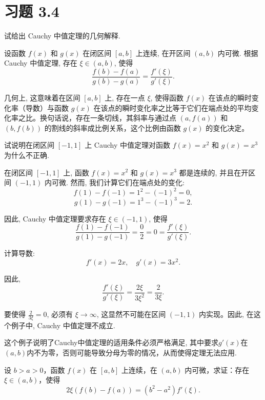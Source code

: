 \section{习题 3.4}

\begin{exercise}[3.4.1]
    试给出 Cauchy 中值定理的几何解释.
\end{exercise}

\begin{solution}
    设函数 $f(x)$ 和 $g(x)$ 在闭区间 $[a, b]$ 上连续, 在开区间 $(a, b)$ 内可微. 根据 Cauchy 中值定理, 存在 $\xi \in (a, b)$, 使得
    $$\frac{f(b) - f(a)}{g(b) - g(a)} = \frac{f'(\xi)}{g'(\xi)}.$$

    几何上, 这意味着在区间 $[a, b]$ 上, 存在一点 $\xi$, 使得函数 $f(x)$ 在该点的瞬时变化率（导数）与函数 $g(x)$ 在该点的瞬时变化率之比等于它们在端点处的平均变化率之比。换句话说，存在一条切线，其斜率与通过点 $(a, f(a))$ 和 $(b, f(b))$ 的割线的斜率成比例关系，这个比例由函数 $g(x)$ 的变化决定。
\end{solution}

\begin{exercise}[3.4.2]
    试说明在闭区间 $[-1, 1]$ 上 Cauchy 中值定理对函数 $f(x) = x^2$ 和 $g(x) = x^3$ 为什么不正确.
\end{exercise}

\begin{solution}
    在闭区间 $[-1, 1]$ 上, 函数 $f(x) = x^2$ 和 $g(x) = x^3$ 都是连续的, 并且在开区间 $(-1, 1)$ 内可微. 然而, 我们计算它们在端点处的变化:
    $$f(1) - f(-1) = 1^2 - (-1)^2 = 0,$$
    $$g(1) - g(-1) = 1^3 - (-1)^3 = 2.$$

    因此, Cauchy 中值定理要求存在 $\xi \in (-1, 1)$, 使得
    $$\frac{f(1) - f(-1)}{g(1) - g(-1)} = \frac{0}{2} = 0 = \frac{f'(\xi)}{g'(\xi)}.$$

    计算导数:
    $$f'(x) = 2x, \quad g'(x) = 3x^2.$$

    因此,
    $$\frac{f'(\xi)}{g'(\xi)} = \frac{2\xi}{3\xi^2} = \frac{2}{3\xi}.$$

    要使得 $\frac{2}{3\xi} = 0$, 必须有 $\xi \to \infty$, 这显然不可能在区间 $(-1, 1)$ 内实现。因此, 在这个例子中, Cauchy 中值定理不成立.

    这个例子说明了Cauchy中值定理的适用条件必须严格满足, 其中要求$g'(x)$在$(a, b)$内不为零，否则可能导致分母为零的情况，从而使得定理无法应用.
\end{solution}

\begin{exercise}[3.4.3]
    设 $b > a > 0$，函数 $f(x)$ 在 $[a, b]$ 上连续，在 $(a, b)$ 内可微，求证：存在 $\xi \in (a, b)$，使得
    $$2\xi (f(b) - f(a)) = (b^2 - a^2) f'(\xi).$$
\end{exercise}

